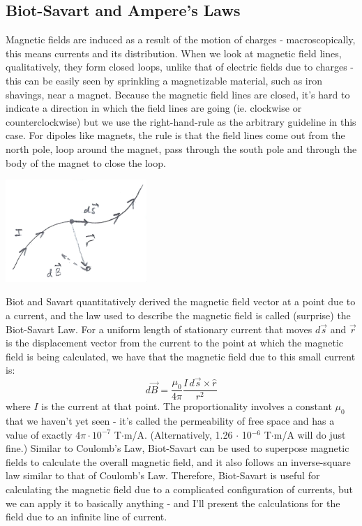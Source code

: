 \subsection{Biot-Savart and Ampere's Laws}
Magnetic fields are induced as a result of the motion of charges - macroscopically, this means currents and its distribution. When we look at magnetic field lines, qualitatively, they form closed loops, unlike that of electric fields due to charges - this can be easily seen by sprinkling a magnetizable material, such as iron shavings, near a magnet. Because the magnetic field lines are closed, it's hard to indicate a direction in which the field lines are going (ie. clockwise or counterclockwise) but we use the right-hand-rule as the arbitrary guideline in this case. For dipoles like magnets, the rule is that the field lines come out from the north pole, loop around the magnet, pass through the south pole and through the body of the magnet to close the loop.\\
\begin{center}
	\includegraphics[width=0.4\textwidth]{images/em/biot-savart.png}
\end{center}
Biot and Savart quantitatively derived the magnetic field vector at a point due to a current, and the law used to describe the magnetic field is called (surprise) the Biot-Savart Law. For a uniform length of stationary current that moves $d\vec s$ and $\vec r$ is the displacement vector from the current to the point at which the magnetic field is being calculated, we have that the magnetic field due to this small current is:
\[
	d\vec B = \frac{\mu_0}{4\pi} \frac{I \, d\vec s \times \hat r}{r^2}
\]
where $I$ is the current at that point. The proportionality involves a constant $\mu_0$ that we haven't yet seen - it's called the permeability of free space and has a value of exactly $4 \pi \cdot 10^{-7}$ T$\cdot$m/A. (Alternatively, 1.26 $\cdot$ 10$^{-6}$ T$\cdot$m/A will do just fine.) Similar to Coulomb's Law, Biot-Savart can be used to superpose magnetic fields to calculate the overall magnetic field, and it also follows an inverse-square law similar to that of Coulomb's Law. Therefore, Biot-Savart is useful for calculating the magnetic field due to a complicated configuration of currents, but we can apply it to basically anything - and I'll present the calculations for the field due to an infinite line of current.\\
